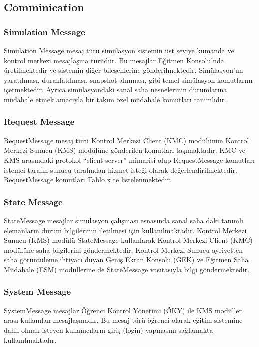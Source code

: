 \documentclass[conference]{IEEEtran}
\begin{document}
\subsection{Comminication}
\subsubsection{ Simulation Message}
Simulation Message mesaj türü simülasyon sistemin üst seviye kumanda ve kontrol merkezi mesajlaşma türüdür. Bu mesajlar Eğitmen Konsolu’nda üretilmektedir ve sistemin diğer bileşenlerine gönderilmektedir. Simülasyon’un yaratılması, duraklatılması, snapshot alınması, gibi temel simülasyon komutlarını içermektedir. Ayrıca simülasyondaki sanal saha nesnelerinin durumlarına müdahale etmek amacıyla bir takım özel müdahale komutları tanımlıdır. 
\subsubsection{Request Message}
RequestMessage mesaj türü Kontrol Merkezi Client (KMC) modülünün Kontrol Merkezi Sunucu (KMS) modülüne gönderilen komutları taşımaktadır. KMC ve KMS arasındaki protokol “client-server” mimarisi olup RequestMessage komutları istemci tarafın sunucu tarafından hizmet isteği olarak değerlendirilmektedir. RequestMessage komutları Tablo x te listelenmektedir.

\subsubsection{State Message}

StateMessage mesajlar simülasyon çalışması esnasında sanal saha daki tanımlı elemanların durum bilgilerinin iletilmesi için kullanılmaktadır. Kontrol Merkezi Sunucu (KMS) modülü StateMessage kullanlarak Kontrol Merkezi Client (KMC) modülüne saha bilgilerini göndermektedir. Kontrol Merkezi Sunucu ayriyetten saha görüntüleme ihtiyacı duyan Geniş Ekran Konsolu (GEK) ve Eğitmen Saha Müdahale (ESM) modüllerine de StateMessage vasıtasıyla bilgi göndermektedir.

\subsubsection{System Message}
SystemMessage mesajlar Öğrenci Kontrol Yönetimi (ÖKY) ile KMS modüller arası kullanılan mesajlaşmadır. Bu mesaj türü öğrenci olarak eğitim sistemine dahil olmak isteyen kullanıcıların giriş (login) yapmasını sağlamakta kullanılmaktadır.
\end{document}

